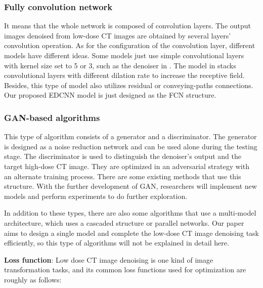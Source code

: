 \documentclass[conference]{IEEEtran}
\begin{document}
        \subsubsection{Fully convolution network}
            It means that the whole network is composed of convolution layers. 
            The output images denoised from low-dose CT images are obtained by several layers' convolution operation.
            As for the configuration of the convolution layer, different models have different ideas. 
            Some models just use simple convolutional layers with kernel size set to 5 or 3, such as the denoiser in \cite{Yang_2018}.
            The model in \cite{gholizadeh-ansari_deep_2020} stacks convolutional layers with different dilation rate to increase the receptive field.
            Besides, this type of model also utilizes residual or conveying-paths connections.
            Our proposed EDCNN model is just designed as the FCN structure. 

        \subsubsection{GAN-based algorithms}
            This type of algorithm consists of a generator and a discriminator. 
            The generator is designed as a noise reduction network and can be used alone during the testing stage.
            The discriminator is used to distinguish the denoiser's output and the target high-dose CT image.
            They are optimized in an adversarial strategy with an alternate training process. 
            There are some existing methods\cite{7934380,Yang_2018,choi_real-time_2018,hu_artifact_2019} that use this structure.
            With the further development of GAN, researchers will implement new models and perform experiments to do further exploration.
        
        \smallskip

        In addition to these types, there are also some algorithms that use a multi-model architecture, which uses a cascaded structure\cite{shan_competitive_2019}\cite{ataei2020cascaded} or parallel networks\cite{li2020lowdose}.
        Our paper aims to design a single model and complete the low-dose CT image denoising task efficiently, so this type of algorithms will not be explained in detail here.
        
        \medskip
        
        \textbf{Loss function}: Low dose CT image denoising is one kind of image transformation tasks, and its common loss functions used for optimization are roughly as follows: 
\end{document}
